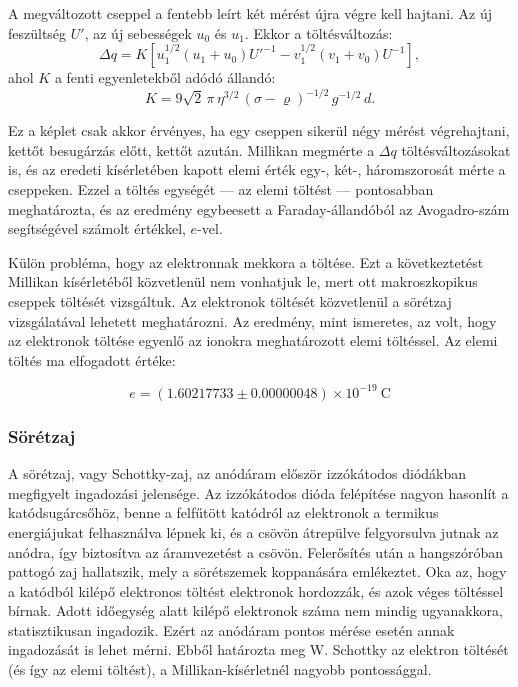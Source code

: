 \documentclass[../main.tex]{subfiles}
\begin{document}
A megváltozott cseppel a fentebb leírt két mérést újra végre kell hajtani.
Az új feszültség $U'$, az új sebességek $u_0$ és $u_1$.
Ekkor a töltésváltozás:
\begin{equation}
\Delta q = K\!\left[ u_1^{1/2}(u_1+u_0){U'}^{-1}
- v_1^{1/2}(v_1+v_0)U^{-1}\right],
\end{equation}
ahol $K$ a fenti egyenletekből adódó állandó:
\begin{equation}
K = 9\sqrt{2}\,\pi\,\eta^{3/2}\,(\sigma-\varrho)^{-1/2}\,g^{-1/2}\,d.
\end{equation}

Ez a képlet csak akkor érvényes, ha egy cseppen sikerül négy mérést
végrehajtani, kettőt besugárzás előtt, kettőt azután.
Millikan megmérte a $\Delta q$ töltésváltozásokat is, és az eredeti
kísérletében kapott elemi érték egy-, két-, háromszorosát mérte a
cseppeken.
Ezzel a töltés egységét — az elemi töltést — pontosabban meghatározta,
és az eredmény egybeesett a Faraday-állandóból az Avogadro-szám
segítségével számolt értékkel, $e$-vel.

Külön probléma, hogy az elektronnak mekkora a töltése. Ezt a következtetést Millikan kísérletéből közvetlenül nem vonhatjuk le, mert ott makroszkopikus cseppek töltését vizsgáltuk.
Az elektronok töltését közvetlenül a sörétzaj vizsgálatával lehetett meghatározni.
Az eredmény, mint ismeretes, az volt, hogy az elektronok töltése
egyenlő az ionokra meghatározott elemi töltéssel.
Az elemi töltés ma elfogadott értéke:

\begin{equation}
e = (1.60217733 \pm 0.00000048)\times 10^{-19}\ \mathrm{C}
\end{equation}

\subsubsection{Sörétzaj}
A sörétzaj, vagy Schottky-zaj, az anódáram először izzókátodos
diódákban megfigyelt ingadozási jelensége.
Az izzókátodos dióda felépítése nagyon hasonlít a katódsugárcsőhöz,
benne a felfűtött katódról az elektronok a termikus energiájukat
felhasználva lépnek ki, és a csövön átrepülve felgyorsulva jutnak
az anódra, így biztosítva az áramvezetést a csövön.
Felerősítés után a hangszóróban pattogó zaj hallatszik, mely a
sörétszemek koppanására emlékeztet.
Oka az, hogy a katódból kilépő elektronos töltést elektronok hordozzák,
és azok véges töltéssel bírnak.
Adott időegység alatt kilépő elektronok száma nem mindig ugyanakkora,
statisztikusan ingadozik.
Ezért az anódáram pontos mérése esetén annak ingadozását is lehet mérni.
Ebből határozta meg W. Schottky az elektron töltését (és így az elemi
töltést), a Millikan-kísérletnél nagyobb pontossággal.
\end{document}
